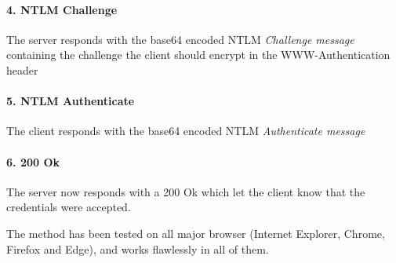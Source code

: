 \documentclass{article}
\begin{document}
\paragraph{4. NTLM Challenge} The server responds with the base64 encoded NTLM \emph{Challenge message} containing the challenge the client should encrypt in the WWW-Authentication header
\paragraph{5. NTLM Authenticate} The client responds with the base64 encoded NTLM \emph{Authenticate message}
\paragraph{6. 200 Ok} The server now responds with a 200 Ok which let the client know that the credentials were accepted.

The method has been tested on all major browser (Internet Explorer, Chrome, Firefox and Edge), and works flawlessly in all of them.
\end{document}
